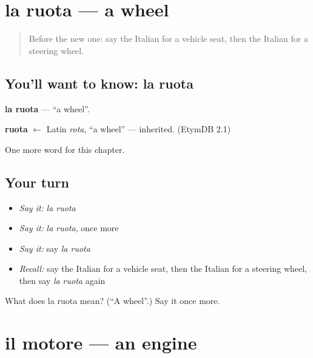 \section[la ruota]{la ruota — a wheel}

\label{lesson:IT-C254-ruota}



\begin{quote}
Before the new one: say the Italian for a vehicle seat, then the Italian for a steering wheel.
\end{quote}

\subsection*{You'll want to know: la ruota}
\textbf{la ruota} — \textquotedblleft{}a wheel\textquotedblright{}.

\begin{cousinweb}
\textbf{ruota} $\leftarrow$ Latin \emph{rota}, \textquotedblleft{}a wheel\textquotedblright{} — inherited. (EtymDB 2.1)
\end{cousinweb}

\begin{grammarlens}[title={What you've built}]
One more word for this chapter.
\end{grammarlens}

\subsection*{Your turn}
\begin{itemize}
\raggedright
  \item \emph{Say it:} \emph{la ruota}
  \item \emph{Say it:} \emph{la ruota}, once more
  \item \emph{Say it:} say \emph{la ruota}
  \item \emph{Recall:} say the Italian for a vehicle seat, then the Italian for a steering wheel, then say \emph{la ruota} again
\end{itemize}

\begin{tcolorbox}[breakable,colback=teal!4,colframe=teal!35!black,title={Before you move on}]
What does la ruota mean? (\textquotedblleft{}A wheel\textquotedblright{}.) Say it once more.
\end{tcolorbox}
\section[il motore]{il motore — an engine}

